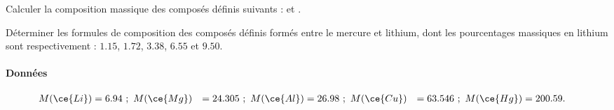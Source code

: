 
\Q Calculer la composition massique des composés définis suivants :  et .

\Q Déterminer les formules de composition des composés définis formés entre le mercure et lithium, dont les pourcentages massiques en lithium sont respectivement : $1.15$, $1.72$, $3.38$, $6.55$ et $9.50$.

\paragraph*{Données}
\begin{align*}
M(\ce{Li}) &= 6.94 ~ ; ~ M(\ce{Mg}) &= 24.305 ~ ; ~ M(\ce{Al}) &= 26.98 ~ ; ~ M(\ce{Cu}) &= 63.546 ~ ; ~ M(\ce{Hg}) &= 200.59.
\end{align*}